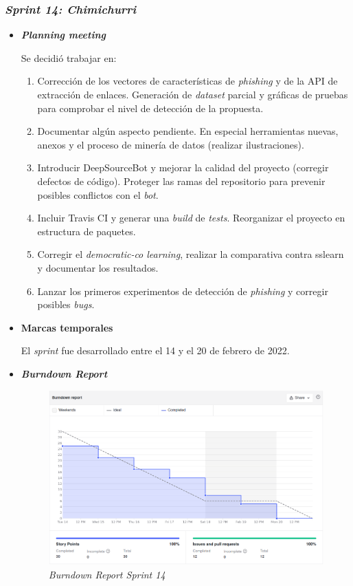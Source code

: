\subsubsection{\textit{Sprint 14: Chimichurri}}
\begin{itemize}
	\item \textbf{\textit{Planning meeting}}
	
	Se decidió trabajar en:
	\begin{enumerate}
		\item Corrección de los vectores de características de \textit{phishing} y de la API de extracción de enlaces. Generación de \textit{dataset} parcial y gráficas de pruebas para comprobar el nivel de detección de la propuesta.
		\item Documentar algún aspecto pendiente. En especial herramientas nuevas, anexos y el proceso de minería de datos (realizar ilustraciones).
		\item Introducir DeepSourceBot y mejorar la calidad del proyecto (corregir defectos de código). Proteger las ramas del repositorio para prevenir posibles conflictos con el \textit{bot}.
		\item Incluir Travis CI y generar una \textit{build} de \textit{tests}. Reorganizar el proyecto en estructura de paquetes.
		\item Corregir el \textit{democratic-co learning}, realizar la comparativa contra sslearn y documentar los resultados. 
		\item Lanzar los primeros experimentos de detección de \textit{phishing} y corregir posibles \textit{bugs}.
	\end{enumerate}

	\item \textbf{Marcas temporales}		
	
	El \textit{sprint} fue desarrollado entre el 14 y el 20 de febrero de 2022.
	
	
	\item \textbf{\textit{Burndown Report}}
	
		\begin{figure}[h]
		\caption{\textit{Burndown Report Sprint 14}}
		\centering
		\includegraphics[width=\textwidth]{../img/anexos/bdr/s14_bdr}
	\end{figure}


\end{itemize}
